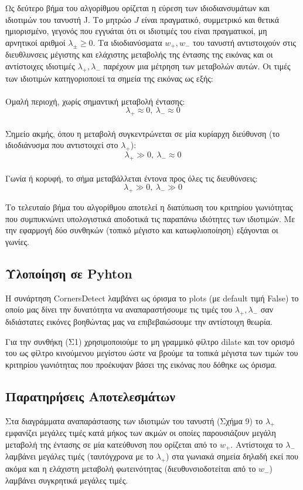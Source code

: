 \documentclass[12pt,a4paper]{article}
\begin{document}
Ως δεύτερο βήμα του αλγορίθμου ορίζεται η εύρεση των ιδιοδιανσυμάτων και ιδιοτιμών του τανυστή \foreignlanguage{english}{J}. Το μητρώο $J$ είναι πραγματικό, συμμετρικό και θετικά ημιορισμένο, γεγονός που εγγυάται ότι οι ιδιοτιμές του είναι πραγματικοί, μη αρνητικοί αριθμοί $\lambda_{\pm} \ge 0$. Τα ιδιοδιανύσματα $w_+, w_-$ του τανυστή αντιστοιχούν στις διευθλυνσεις μέγιστης και ελάχιστης μεταβολής της έντασης της εικόνας και οι αντίστοιχες ιδιοτιμές $\lambda_+, \lambda_-$ παρέχουν μια μέτρηση των μεταβολών αυτών. Οι τιμές των ιδιοτιμών κατηγοριοποιεί τα σημεία της εικόνας ως εξής:
\\\\
Ομαλή περιοχή, χωρίς σημαντική μεταβολή έντασης: $$\lambda_+ \approx 0, \ \lambda_- \approx 0$$
\\
Σημείο ακμής, όπου η μεταβολή συγκεντρώνεται σε μία κυρίαρχη διεύθυνση (το ιδιοδιάνυσμα που αντιστοιχεί στο $\lambda_+$):$$\lambda_+ \gg 0, \ \lambda_- \approx 0$$
\\
Γωνία ή κορυφή, το σήμα μεταβάλλεται έντονα προς όλες τις διευθύνσεις:$$\lambda_+ \gg 0, \ \lambda_- \gg 0$$

Το τελευταίο βήμα του αλγορίθμου αποτελεί η διατύπωση του κριτηρίου γωνιότητας που συμπυκνώνει υπολογιστικά αποδοτικά τις παραπάνω ιδιότητες των ιδιοτιμών. Με την εφαρμογή δύο συνθηκών (τοπικό μέγιστο και κατωφλιοποίηση) εξάγονται οι γωνίες.


\subsection*{Υλοποίηση σε \foreignlanguage{english}{Pyhton}}
\hspace{0.6cm}Η συνάρτηση \foreignlanguage{english}{CornersDetect} λαμβάνει ως όρισμα το \foreignlanguage{english}{plots} (με \foreignlanguage{english}{default} τιμή \foreignlanguage{english}{False}) το οποίο μας δίνει την δυνατότητα να αναπαραστήσουμε τις τιμές του $\lambda_+, \lambda_-$ σαν διδιάστατες εικόνες βοηθώντας μας να επιβεβαιώσουμε την αντίστοιχη θεωρία.


Για την συνθήκη (Σ1) χρησιμοποιούμε το μη γραμμικό φίλτρο \foreignlanguage{english}{dilate} και τον ορισμό του ως φίλτρο κινούμενου μεγίστου ώστε να βρούμε τα τοπικά μέγιστα των τιμών του κριτηρίου γωνιότητας που προέκυψαν βάσει της εικόνας που δόθηκε ως όρισμα.

\subsection*{Παρατηρήσεις Αποτελεσμάτων}
\hspace{0.6cm}Στα διαγράμματα αναπαράστασης των ιδιοτιμών του τανυστή (Σχήμα 9) το $\lambda_+$ εμφανίζει μεγάλες τιμές κατά μήκος των ακμών οι οποίες παρουσιάζουν μεγάλη μεταβολή της έντασης σε μία κατεύθυνση που ορίζεται από το $w_+$. Αντίστοιχα το  $\lambda_-$ λαμβάνει μεγάλες τιμές (ταυτόγχρονα με το  $\lambda_+$) στα γωνιακά σημεία δηλαδή εκεί που ακόμα και η ελάχιστη μεταβολή φωτεινότητας (διευθυνσιοδοτείται από το $w_-$) λαμβάνει συγκρητικά μεγάλες τιμές. 
\end{document}
